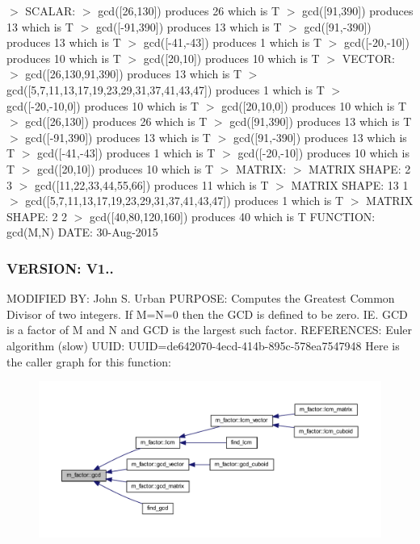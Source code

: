 $>$ S\+C\+A\+L\+AR\+: $>$ gcd(\mbox{[}26,130\mbox{]}) produces 26 which is T $>$ gcd(\mbox{[}91,390\mbox{]}) produces 13 which is T $>$ gcd(\mbox{[}-\/91,390\mbox{]}) produces 13 which is T $>$ gcd(\mbox{[}91,-\/390\mbox{]}) produces 13 which is T $>$ gcd(\mbox{[}-\/41,-\/43\mbox{]}) produces 1 which is T $>$ gcd(\mbox{[}-\/20,-\/10\mbox{]}) produces 10 which is T $>$ gcd(\mbox{[}20,10\mbox{]}) produces 10 which is T $>$ V\+E\+C\+T\+OR\+: $>$ gcd(\mbox{[}26,130,91,390\mbox{]}) produces 13 which is T $>$ gcd(\mbox{[}5,7,11,13,17,19,23,29,31,37,41,43,47\mbox{]}) produces 1 which is T $>$ gcd(\mbox{[}-\/20,-\/10,0\mbox{]}) produces 10 which is T $>$ gcd(\mbox{[}20,10,0\mbox{]}) produces 10 which is T $>$ gcd(\mbox{[}26,130\mbox{]}) produces 26 which is T $>$ gcd(\mbox{[}91,390\mbox{]}) produces 13 which is T $>$ gcd(\mbox{[}-\/91,390\mbox{]}) produces 13 which is T $>$ gcd(\mbox{[}91,-\/390\mbox{]}) produces 13 which is T $>$ gcd(\mbox{[}-\/41,-\/43\mbox{]}) produces 1 which is T $>$ gcd(\mbox{[}-\/20,-\/10\mbox{]}) produces 10 which is T $>$ gcd(\mbox{[}20,10\mbox{]}) produces 10 which is T $>$ M\+A\+T\+R\+IX\+: $>$ M\+A\+T\+R\+IX S\+H\+A\+PE\+: 2 3 $>$ gcd(\mbox{[}11,22,33,44,55,66\mbox{]}) produces 11 which is T $>$ M\+A\+T\+R\+IX S\+H\+A\+PE\+: 13 1 $>$ gcd(\mbox{[}5,7,11,13,17,19,23,29,31,37,41,43,47\mbox{]}) produces 1 which is T $>$ M\+A\+T\+R\+IX S\+H\+A\+PE\+: 2 2 $>$ gcd(\mbox{[}40,80,120,160\mbox{]}) produces 40 which is T F\+U\+N\+C\+T\+I\+ON\+: gcd(\+M,\+N) D\+A\+TE\+: 30-\/\+Aug-\/2015 \subsubsection*{V\+E\+R\+S\+I\+ON\+: V1..}

M\+O\+D\+I\+F\+I\+ED BY\+: John S. Urban P\+U\+R\+P\+O\+SE\+: Computes the Greatest Common Divisor of two integers. If M=N=0 then the G\+CD is defined to be zero. IE. G\+CD is a factor of M and N and G\+CD is the largest such factor. R\+E\+F\+E\+R\+E\+N\+C\+ES\+: Euler algorithm (slow) U\+U\+ID\+: U\+U\+ID=de642070-\/4ecd-\/414b-\/895c-\/578ea7547948 Here is the caller graph for this function\+:
\nopagebreak
\begin{figure}[H]
\begin{center}
\leavevmode
\includegraphics[width=350pt]{namespacem__factor_a69e8c33eff58fc447cfb8d4f3d4fae77_icgraph}
\end{center}
\end{figure}
\mbox{\label{namespacem__factor_aed74f995a7c71e8cec13964b82457403}} 

